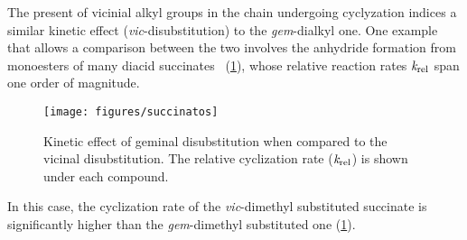 The present of vicinial alkyl groups in the chain undergoing cyclyzation
indices a similar kinetic effect (\emph{vic}-disubstitution)
to the \emph{gem}-dialkyl one.
One example that allows a comparison between the two
involves the anhydride formation from monoesters of many diacid
succinates~\cite{Kirby_1980,Bruice_1960a,Bruice_1960b,Bruice_1965,Lightstone_1994}
(\cref{fig:succinatos}), whose relative reaction rates
$\emph{k}_\text{rel}$ span one order of magnitude.
%
\begin{figure}[hbtp]
	\centering
	\texttt{[image: figures/succinatos]}
	\caption[Kinetic effects of geminal and vicinal disubstitutions.]{
		Kinetic effect of geminal disubstitution when compared to the vicinal disubstitution.
		The relative cyclization rate ($\emph{k}_\text{rel}$)
		is shown under each compound.}\label{fig:succinatos}
\end{figure}
%
In this case, the
cyclization rate
of the
\emph{vic}-dimethyl substituted
succinate
is significantly higher than the \emph{gem}-dimethyl substituted one
(\cref{fig:succinatos}).

